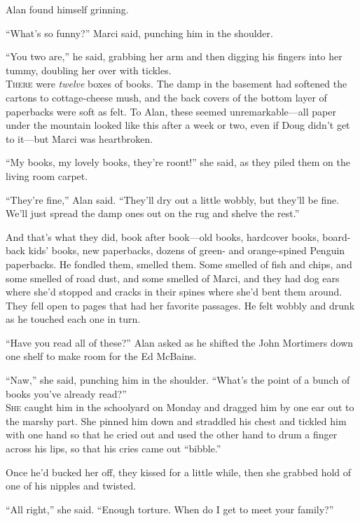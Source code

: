 \documentclass{article}
\begin{document}
Alan found himself grinning.

``What's so funny?'' Marci said, punching him in the shoulder.

``You two are,'' he said, grabbing her arm and then digging his
fingers into her tummy, doubling her over with tickles.
\\
\lettrine[lines=3, lhang=.5, nindent=0pt, findent=2pt]{T}{here} were \textit{twelve} boxes of books.  The damp in the basement
had softened the cartons to cottage-cheese mush, and the back covers
of the bottom layer of paperbacks were soft as felt.  To Alan, these
seemed unremarkable---all paper under the mountain looked like this
after a week or two, even if Doug didn't get to it---but Marci was
heartbroken.

``My books, my lovely books, they're roont!'' she said, as they piled
them on the living room carpet.

``They're fine,'' Alan said.  ``They'll dry out a little wobbly, but
they'll be fine.  We'll just spread the damp ones out on the rug and
shelve the rest.''

And that's what they did, book after book---old books, hardcover
books, board-back kids' books, new paperbacks, dozens of green- and
orange-spined Penguin paperbacks.  He fondled them, smelled them. 
Some smelled of fish and chips, and some smelled of road dust, and
some smelled of Marci, and they had dog ears where she'd stopped and
cracks in their spines where she'd bent them around.  They fell open
to pages that had her favorite passages.  He felt wobbly and drunk as
he touched each one in turn.

``Have you read all of these?'' Alan asked as he shifted the John
Mortimers down one shelf to make room for the Ed McBains.

``Naw,'' she said, punching him in the shoulder.  ``What's the point
of a bunch of books you've already read?''
\\
\lettrine[lines=3, lhang=.5, nindent=0pt, findent=2pt]{S}{he} caught him in the schoolyard on Monday and dragged him by one ear
out to the marshy part.  She pinned him down and straddled his chest
and tickled him with one hand so that he cried out and used the other
hand to drum a finger across his lips, so that his cries came out
``bibble.''

Once he'd bucked her off, they kissed for a little while, then she
grabbed hold of one of his nipples and twisted.

``All right,'' she said.  ``Enough torture.  When do I get to meet
your family?''
\end{document}
